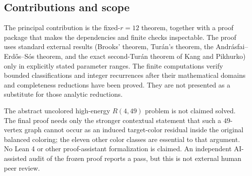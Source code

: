 \subsection{Contributions and scope}

The principal contribution is the fixed-$r=12$ theorem, together with a proof package that makes the dependencies and finite checks inspectable. The proof uses standard external results (Brooks' theorem, Tur\'an's theorem, the Andrásfai--Erd\H{o}s--Sós theorem, and the exact second-Tur\'an theorem of Kang and Pikhurko) only in explicitly stated parameter ranges. The finite computations verify bounded classifications and integer recurrences after their mathematical domains and completeness reductions have been proved. They are not presented as a substitute for those analytic reductions.

The abstract uncolored high-energy $R(4,49)$ problem is not claimed solved. The final proof needs only the stronger contextual statement that such a $49$-vertex graph cannot occur as an induced target-color residual inside the original balanced coloring; the eleven other color classes are essential to that argument. No Lean 4 or other proof-assistant formalization is claimed. An independent AI-assisted audit of the frozen proof reports a pass, but this is not external human peer review.

